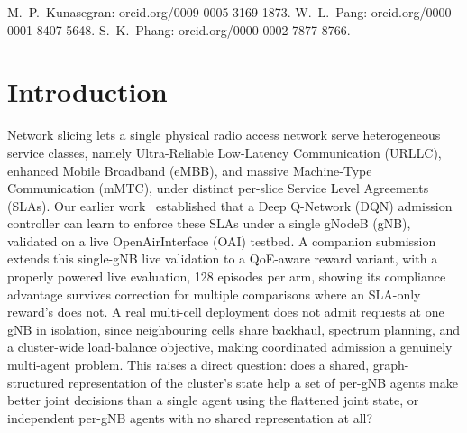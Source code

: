 \documentclass[pdflatex,sn-basic,Numbered]{sn-jnl}%
\begin{document}
\maketitle

\noindent\footnotesize
M.~P.~Kunasegran: orcid.org/0009-0005-3169-1873.
W.~L.~Pang: orcid.org/0000-0001-8407-5648.
S.~K.~Phang: orcid.org/0000-0002-7877-8766.
\normalsize
\vspace{6pt}

\section{Introduction}
Network slicing lets a single physical radio access network serve heterogeneous service classes, namely Ultra-Reliable Low-Latency Communication (URLLC), enhanced Mobile Broadband (eMBB), and massive Machine-Type Communication (mMTC), under distinct per-slice Service Level Agreements (SLAs). Our earlier work~\cite{mecon-paper1,icraie-paper2}
established that a Deep Q-Network (DQN) admission controller can learn
to enforce these SLAs under a single gNodeB (gNB), validated on a live
OpenAirInterface (OAI) testbed. A companion submission~\cite{cacs26-paper} extends this single-gNB live validation to a QoE-aware reward variant, with a properly powered live evaluation, 128 episodes per arm, showing its compliance advantage survives correction for multiple comparisons where an SLA-only reward's does not. A real multi-cell deployment does not admit requests at one gNB in isolation, since neighbouring cells share backhaul, spectrum planning, and a cluster-wide load-balance objective, making coordinated admission a genuinely multi-agent problem. This raises a direct question: does a shared, graph-structured representation of the cluster's state help a set of per-gNB agents make better joint decisions than a single agent using the flattened joint state, or independent per-gNB agents with no shared representation at all?
\end{document}
